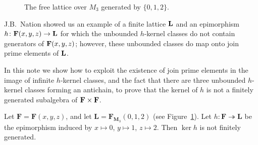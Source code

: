 \begin{figure}[!h]
    \caption{The free lattice over $M_3$ generated by $\{0, 1, 2\}$.}
    \label{fig:1}
  \end{figure}
  
  

J.B.~Nation showed us an example of a finite lattice $\mathbf{L}$ 
and an epimorphism $h \colon \mathbf{F}(x,y,z) \to \mathbf{L}$
for which the unbounded $h$-kernel classes do not contain generators of $\mathbf{F}(x,y,z)$;
however, these unbounded classes do map onto join prime elements of $\mathbf{L}$.

In this note we show how to exploit the existence of join prime elements in the image of 
infinite $h$-kernel classes, and the fact that there are three unbounded 
$h$-kernel classes forming an antichain, to prove that the kernel of $h$ 
is not a finitely generated subalgebra of $\mathbf{F} \times \mathbf{F}$.
\begin{proposition}
  \label{prop:2.2}
Let $\mathbf{F} = \mathbf{F}(x,y,z)$, and let $\mathbf{L} = \mathbf{F}_{\mathbf{M}_3}(0,1,2)$ (see Figure~\ref{fig:1}).  
Let $h\colon \mathbf{F} \twoheadrightarrow \mathbf{L}$ be the epimorphism induced by $x\mapsto 0$, $y\mapsto 1$, $z\mapsto 2$. Then $\operatorname{ker}h$ is not finitely generated.  
\end{proposition}

